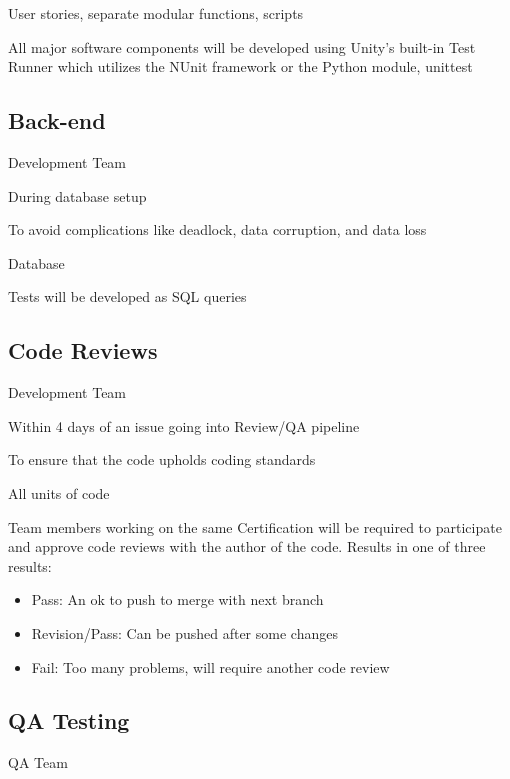 \documentclass[letterpaper,10pt,english,openany,oneside]{sphinxmanual}
\begin{document}
 User stories, separate modular functions, scripts

 All major software components will be developed using Unity’s built-in Test Runner which utilizes the NUnit framework or the Python module, unittest


\subsection{Back-end}
\label{\detokenize{test_plan/strategy:back-end}}
 Development Team

 During database setup

 To avoid complications like deadlock, data corruption, and data loss

 Database

 Tests will be developed as SQL queries


\subsection{Code Reviews}
\label{\detokenize{test_plan/strategy:code-reviews}}
 Development Team

 Within 4 days of an issue going into Review/QA pipeline

 To ensure that the code upholds coding standards

 All units of code

 Team members working on the same Certification will be required to participate and approve code reviews with the author of the code. Results in one of three results:
\begin{itemize}
\item {} 
Pass: An ok to push to merge with next branch

\item {} 
Revision/Pass: Can be pushed after some changes

\item {} 
Fail: Too many problems, will require another code review

\end{itemize}


\subsection{QA Testing}
\label{\detokenize{test_plan/strategy:qa-testing}}
 QA Team
\end{document}
